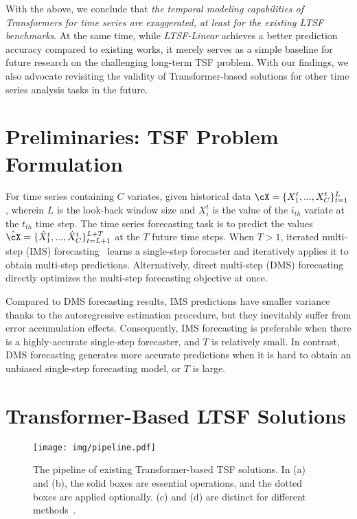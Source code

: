 \documentclass[10pt,twocolumn,letterpaper]{article}
\newcommand{\modelname}{\emph{LTSF-Linear}\xspace}
\begin{document}
With the above, we conclude that \emph{the temporal modeling capabilities of Transformers for time series are exaggerated, at least for the existing LTSF benchmarks}. At the same time, while \modelname achieves a better prediction accuracy compared to existing works, it merely serves as a simple baseline for future research on the challenging long-term TSF problem. With our findings, we also advocate revisiting the validity of Transformer-based solutions for other time series analysis tasks in the future.

 \section{Preliminaries: TSF Problem Formulation}
\label{sec:related}

\label{sec:pre_problem}
For time series containing $C$ variates, given historical data $\cX=\{X^t_{1}, ..., X^t_{C}\}{_{t=1}^{L}}$, wherein $L$ is the look-back window size and  $X^t_{i}$ is the value of the $i_{th}$ variate at the $t_{th}$ time step. The time series forecasting task is to predict the values $\hat{\cX}=\{\hat{X}^t_{1}, ..., \hat{X}^t_{C}\}{_{t=L+1}^{L+T}}$ at the $T$ future time steps. 
When $T>1$, iterated multi-step (IMS) forecasting~\cite{taieb2012recursive} learns a single-step forecaster and iteratively applies it to obtain multi-step predictions. Alternatively, direct multi-step (DMS) forecasting~\cite{chevillon2007direct} directly optimizes the multi-step forecasting objective at once. 


Compared to DMS forecasting results, IMS predictions have smaller variance thanks to the autoregressive estimation procedure, but they inevitably suffer from error accumulation effects. Consequently, IMS forecasting is preferable when there is a highly-accurate single-step forecaster, and $T$ is relatively small. In contrast, DMS forecasting generates more accurate predictions when it is hard to obtain an unbiased single-step forecasting model, or $T$ is large. 




 \section{Transformer-Based LTSF Solutions}
\label{sec:trans}


\begin{figure*}[t]
\vspace{-0.2cm}
\begin{center}
\texttt{[image: img/pipeline.pdf]}
\end{center}
\vspace{-0.4cm}
\caption{The pipeline of existing Transformer-based TSF solutions. In (a) and (b), the solid boxes are essential operations, and the dotted boxes are applied optionally. (c) and (d) are distinct for different methods~\cite{li2019LogTrans,informer,xu2021autoformer,liu2021pyraformer,zhou2022fedformer}.}
\vspace{-0.6cm}
\label{fig:pipeline}
\end{figure*}
\end{document}
